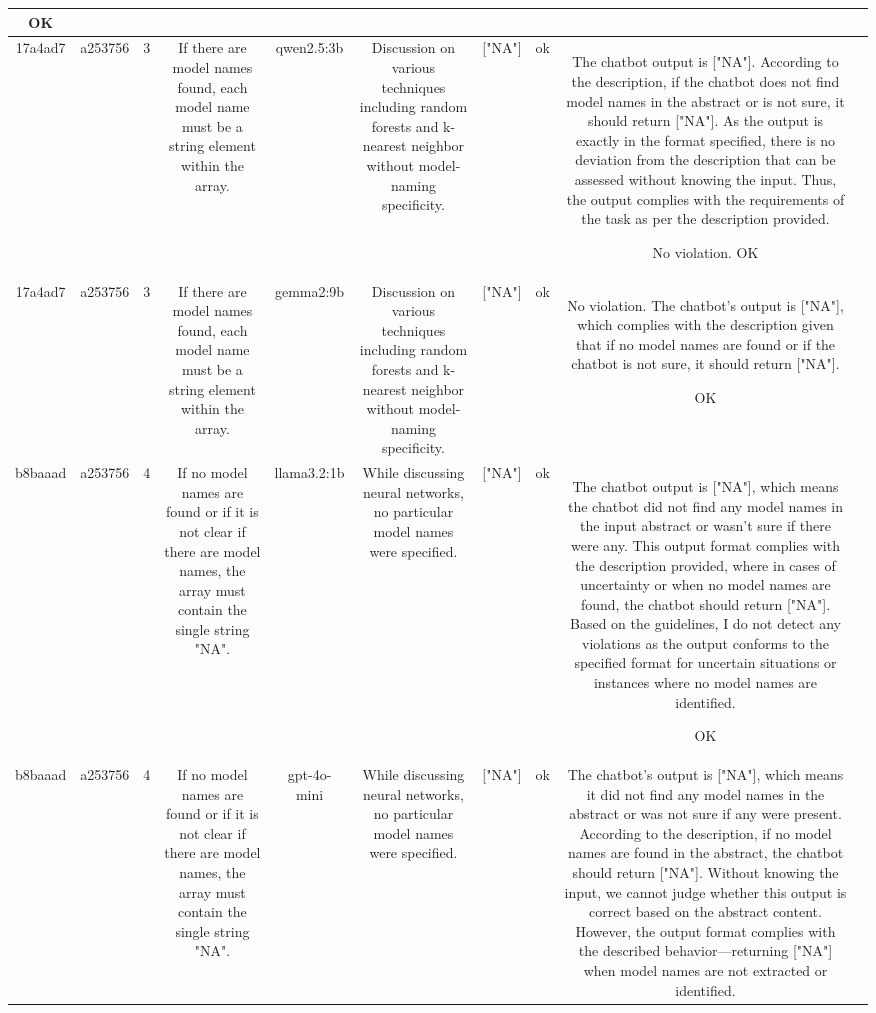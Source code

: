 \begin{table}[h!]
\begin{tabular}{|c|c|c|c|c|c|c|c|c|c|}
OK & \\
\hline
17a4ad7 & a253756 & 3 & If there are model names found, each model name must be a string element within the array. & qwen2.5:3b & Discussion on various techniques including random forests and k-nearest neighbor without model-naming specificity. & ["NA"] & ok & The chatbot output is ["NA"]. According to the description, if the chatbot does not find model names in the abstract or is not sure, it should return ["NA"]. As the output is exactly in the format specified, there is no deviation from the description that can be assessed without knowing the input. Thus, the output complies with the requirements of the task as per the description provided.

No violation.
OK & \\
\hline
17a4ad7 & a253756 & 3 & If there are model names found, each model name must be a string element within the array. & gemma2:9b & Discussion on various techniques including random forests and k-nearest neighbor without model-naming specificity. & ["NA"] 
 & ok & No violation. The chatbot's output is ["NA"], which complies with the description given that if no model names are found or if the chatbot is not sure, it should return ["NA"]. 

OK & \\
\hline
b8baaad & a253756 & 4 & If no model names are found or if it is not clear if there are model names, the array must contain the single string "NA". & llama3.2:1b & While discussing neural networks, no particular model names were specified. & ["NA"] & ok & The chatbot output is ["NA"], which means the chatbot did not find any model names in the input abstract or wasn't sure if there were any. This output format complies with the description provided, where in cases of uncertainty or when no model names are found, the chatbot should return ["NA"]. Based on the guidelines, I do not detect any violations as the output conforms to the specified format for uncertain situations or instances where no model names are identified.

OK & \\
\hline
b8baaad & a253756 & 4 & If no model names are found or if it is not clear if there are model names, the array must contain the single string "NA". & gpt-4o-mini & While discussing neural networks, no particular model names were specified. & ["NA"] & ok & The chatbot's output is ["NA"], which means it did not find any model names in the abstract or was not sure if any were present. According to the description, if no model names are found in the abstract, the chatbot should return ["NA"]. Without knowing the input, we cannot judge whether this output is correct based on the abstract content. However, the output format complies with the described behavior—returning ["NA"] when model names are not extracted or identified.


\end{tabular}
\end{table}
